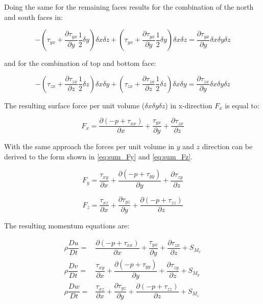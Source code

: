 \documentclass[../thesis.tex]{subfiles}
\begin{document}
Doing the same for the remaining faces results for the combination of the north and south faces in:

\begin{equation}
	- \left( \tau_{yx} + \dfrac{\partial \tau_{yx}}{\partial y} \dfrac{1}{2} \delta y \right) \delta x \delta z + 
	\left( \tau_{yx} + \dfrac{\partial \tau_{yx}}{\partial y} \dfrac{1}{2} \delta y \right) \delta x \delta z = 
	\dfrac{\partial \tau_{yx}}{\partial y} \delta x \delta y \delta z
\end{equation}

and for the combination of top and bottom face:

\begin{equation}
	- \left( \tau_{zx} + \dfrac{\partial \tau_{zx}}{\partial z} \dfrac{1}{2} \delta z \right) \delta x \delta y + 
	\left( \tau_{zx} + \dfrac{\partial \tau_{zx}}{\partial z} \dfrac{1}{2} \delta z \right) \delta x \delta y = 
	\dfrac{\partial \tau_{zx}}{\partial y} \delta x \delta y \delta z
\end{equation}

The resulting surface force per unit volume ($\delta x \delta y \delta z$) in x-direction $ F_x $ is equal to:

\begin{equation}
	F_x = \dfrac{\partial (- p + \tau_{xx})}{\partial x} + \dfrac{\tau_{yx}}{\partial y} + \dfrac{\partial \tau_{zx}}{\partial z}
\end{equation}

With the same approach the forces per unit volume in $ y $ and $ z $ direction can be derived to the form shown in \autoref{eq:sum_Fy} and \autoref{eq:sum_Fz}.

\begin{equation}
	\label{eq:sum_Fy}
	F_y =  \dfrac{\tau_{xy}}{\partial x} + \dfrac{\partial (- p + \tau_{yy})}{\partial y} + \dfrac{\partial \tau_{zy}}{\partial z}
\end{equation}

\begin{equation}
	\label{eq:sum_Fz}
	F_z = \dfrac{\tau_{xz}}{\partial x} + \dfrac{\partial \tau_{yz}}{\partial y} + \dfrac{\partial (- p + \tau_{zz})}{\partial z}
\end{equation}

The resulting momentum equations are:

\begin{eqnarray}
	\rho \dfrac{Du}{Dt} = & \dfrac{\partial (-p + \tau_{xx})}{\partial x} + \dfrac{\tau_{yx}}{\partial y} + \dfrac{\partial \tau_{zx}}{\partial z} + S_{M_x} \\
	\rho \dfrac{Dv}{Dt} = & \dfrac{\tau_{xy}}{\partial x} + \dfrac{\partial (-p + \tau_{yy})}{\partial y} + \dfrac{\partial \tau_{zy}}{\partial z} +  S_{M_y} \\
	\rho \dfrac{Dw}{Dt} = & \dfrac{\tau_{xz}}{\partial x} + \dfrac{\partial \tau_{yz}}{\partial y} + \dfrac{\partial (-p + \tau_{zz})}{\partial z} +
	S_{M_z}
\end{eqnarray}
\end{document}
